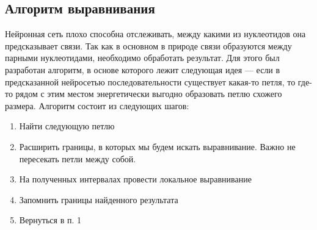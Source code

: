 \documentclass[14pt]{matmex-diploma-custom}
\begin{document}
\subsection{Алгоритм выравнивания}
Нейронная сеть плохо способна отслеживать, между какими из нуклеотидов она предсказывает связи. Так как в основном в природе связи образуются между парными нуклеотидами, необходимо обработать результат. Для этого был разработан алгоритм, в основе которого лежит следующая идея --- если в предсказанной нейросетью последовательности существует какая-то петля, то где-то рядом с этим местом энергетически выгодно образовать петлю схожего размера. Алгоритм состоит из следующих шагов:
\begin{enumerate}
	\item Найти следующую петлю
	\item Расширить границы, в которых мы будем искать выравнивание. Важно не пересекать петли между собой.
	\item На полученных интервалах провести локальное выравнивание
	\item Запомнить границы найденного результата
	\item Вернуться в п. 1
\end{enumerate}
\end{document}
